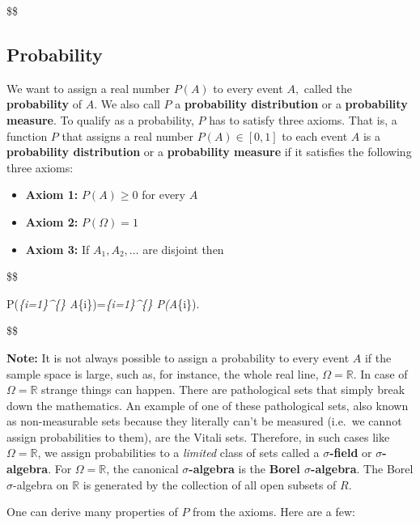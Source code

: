 \documentclass[
  letterpaper,
  DIV=11,
  numbers=noendperiod]{scrreprt}
\providecommand{\tightlist}{%
  \setlength{\itemsep}{0pt}\setlength{\parskip}{0pt}}\usepackage{longtable,booktabs,array}
\theoremstyle{definition}
\theoremstyle{plain}
\theoremstyle{plain}
\theoremstyle{remark}
\begin{document}
\$\$

\hypertarget{probability}{%
\subsection{Probability}\label{probability}}

We want to assign a real number \(P(A)\) to every event \(A,\) called
the \textbf{probability} of \(A .\) We also call \(P\) a
\textbf{probability distribution} or a \textbf{probability measure}. To
qualify as a probability, \(P\) has to satisfy three axioms. That is, a
function \(P\) that assigns a real number \(P(A)\in[0,1]\) to each event
\(A\) is a \textbf{probability distribution} or a \textbf{probability
measure} if it satisfies the following three axioms:

\begin{itemize}
\tightlist
\item
  \textbf{Axiom 1:} \(P(A) \geq 0\) for every \(A\)
\item
  \textbf{Axiom 2:} \(P(\Omega)=1\)
\item
  \textbf{Axiom 3:} If \(A_{1}, A_{2}, \ldots\) are disjoint then
\end{itemize}

\$\$

P\left(\bigcup\emph{\{i=1\}\^{}\{\infty\}
A}\{i\}\right)=\sum\emph{\{i=1\}\^{}\{\infty\} P\left(A}\{i\}\right).

\$\$

\textbf{Note:} It is not always possible to assign a probability to
every event \(A\) if the sample space is large, such as, for instance,
the whole real line, \(\Omega=\mathbb{R}\). In case of
\(\Omega=\mathbb{R}\) strange things can happen. There are pathological
sets that simply break down the mathematics. An example of one of these
pathological sets, also known as non-measurable sets because they
literally can't be measured (i.e.~we cannot assign probabilities to
them), are the Vitali sets. Therefore, in such cases like
\(\Omega=\mathbb{R}\), we assign probabilities to a \emph{limited} class
of sets called a \textbf{\(\sigma\)-field} or
\textbf{\(\sigma\)-algebra}. For \(\Omega=\mathbb{R}\), the canonical
\textbf{\(\sigma\)-algebra} is the \textbf{Borel \(\sigma\)-algebra}.
The Borel \(\sigma\)-algebra on \(\mathbb{R}\) is generated by the
collection of all open subsets of \(R\).

\bigskip

One can derive many properties of \(P\) from the axioms. Here are a few:
\end{document}
